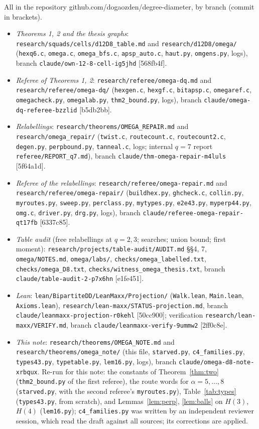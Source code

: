 \documentclass[11pt]{amsart}
\newcommand{\file}[1]{\nolinkurl{#1}}
\theoremstyle{plain}
\theoremstyle{definition}
\theoremstyle{remark}
\begin{document}
All in the repository github.com/dogaozden/degree-diameter, by branch (commit in brackets).
\begin{itemize}[leftmargin=1.5em]
\item \emph{Theorems 1, 2 and the thesis graphs}: \file{research/squads/cells/d12D8_table.md} and
  \file{research/d12D8/omega/} (\file{hexq6.c}, \file{omega.c}, \file{omega_bfs.c}, \file{apsp_auto.c},
  \file{haut.py}, \file{omgens.py}, logs), branch \file{claude/own-12-8-cell-ig5jhd} [568fb4f].
\item \emph{Referee of Theorems 1, 2}: \file{research/referee/omega-dq.md} and \file{research/referee/omega-dq/}
  (\file{hexgen.c}, \file{hexgf.c}, \file{bitapsp.c}, \file{omegaref.c}, \file{omegacheck.py},
  \file{omegalab.py}, \file{thm2_bound.py}, logs), branch \file{claude/omega-dq-referee-bzzlid} [b5db2bb].
\item \emph{Relabellings}: \file{research/theorems/OMEGA_REPAIR.md} and \file{research/omega_repair/}
  (\file{twist.c}, \file{routecount.c}, \file{routecount2.c}, \file{degen.py}, \file{perpbound.py},
  \file{tanneal.c}, logs; internal $q = 7$ report \file{referee/REPORT_q7.md}), branch
  \file{claude/thm-omega-repair-m4luls} [5f64a1d].
\item \emph{Referee of the relabellings}: \file{research/referee/omega-repair.md} and
  \file{research/referee/omega-repair/} (\file{buildhex.py}, \file{ghcheck.c}, \file{collin.py},
  \file{myroutes.py}, \file{sweep.py}, \file{perclass.py}, \file{mytypes.py}, \file{e2e43.py},
  \file{myperp44.py}, \file{omg.c}, \file{driver.py}, \file{drg.py}, logs), branch
  \file{claude/referee-omega-repair-qt17fb} [6337c85].
\item \emph{Table audit} (free relabellings at $q = 2, 3$; searches; union bound; first moment):
  \file{research/projects/table-audit/AUDIT.md} \S\S4, 7, \file{omega/NOTES.md}, \file{omega/labs/},
  \file{checks/omega_labelled.txt}, \file{checks/omega_D8.txt}, \file{checks/witness_omega_thesis.txt}, branch
  \file{claude/table-audit-2-p7x6hn} [e1fe451].
\item \emph{Lean}: \file{lean/BipartiteDD/LeanMaxx/Projection/} (\file{Walk.lean}, \file{Main.lean}, \file{Axioms.lean}),
  \file{research/lean-maxx/STATUS-projection.md}, branch \file{claude/leanmaxx-projection-r0kehl} [50cc900];
  verification \file{research/lean-maxx/VERIFY.md}, branch \file{claude/leanmaxx-verify-9ummw2} [2ff0c8e].
\item \emph{This note}: \file{research/theorems/OMEGA_NOTE.md} and \file{research/theorems/omega_note/}
  (this file, \file{starved.py}, \file{c4_families.py}, \file{types43.py}, \file{typetable.py}, \file{lem16.py}, logs), branch
  \file{claude/omega-d8-note-xrbqux}. Re-run for this note: the constants of Theorem~\ref{thm:two}
  (\file{thm2_bound.py} of the first referee), the route words for $\alpha = 5, \dots, 8$ (\file{starved.py}, with the
  second referee's \file{myroutes.py}), Table~\ref{tab:types} (\file{types43.py}, from scratch), and
Lemmas~\ref{lem:perp}, \ref{lem:balls} on $H(3)$, $H(4)$ (\file{lem16.py}); \file{c4_families.py} was written by an
independent reviewer session, which read the draft against all sources; its corrections are applied.
\end{itemize}
\end{document}

